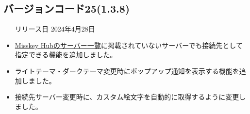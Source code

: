 \subsection*{バージョンコード25(1.3.8)}
\begin{itemize}
    \item[リリース日] 2024年4月28日
\end{itemize}

\new
\begin{itemize}
    \item \href{https://misskey-hub.net/ja/servers/}{Misskey Hubのサーバー一覧}に掲載されていないサーバーでも接続先として指定できる機能を追加しました。
    \item ライトテーマ・ダークテーマ変更時にポップアップ通知を表示する機能を追加しました。
\end{itemize}

\change
\begin{itemize}
    \item 接続先サーバー変更時に、カスタム絵文字を自動的に取得するように変更しました。
\end{itemize}

\fix

